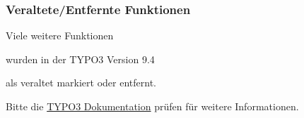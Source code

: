 \begin{frame}[fragile]
	\frametitle{Veraltete/Entfernte Funktionen}

	\vspace{0.6cm}
	\begin{center}
		Viele weitere Funktionen
	\end{center}
	\vspace{-0.8cm}
	\begin{center}
		wurden in der TYPO3 Version 9.4
	\end{center}
	\vspace{-0.8cm}
	\begin{center}
		als veraltet markiert oder entfernt.
	\end{center}
	\vspace{-0.6cm}
	\begin{center}
		Bitte die
\href{https://docs.typo3.org/typo3cms/extensions/core/latest/Changelog/9.4/Index.html#deprecation}{TYPO3 Dokumentation} prüfen für weitere Informationen.
	\end{center}

\end{frame}


